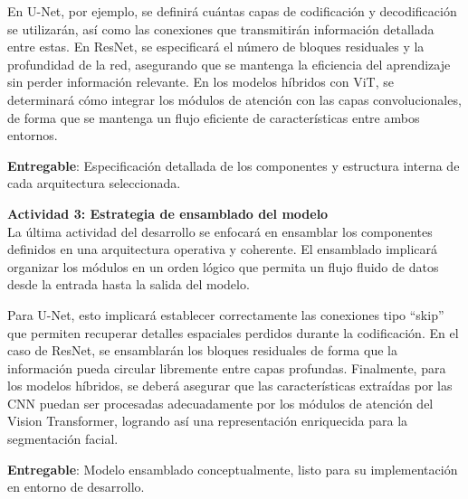 En U-Net, por ejemplo, se definirá cuántas capas de codificación y decodificación se utilizarán, así como las conexiones que transmitirán información detallada entre estas. En ResNet, se especificará el número de bloques residuales y la profundidad de la red, asegurando que se mantenga la eficiencia del aprendizaje sin perder información relevante. En los modelos híbridos con ViT, se determinará cómo integrar los módulos de atención con las capas convolucionales, de forma que se mantenga un flujo eficiente de características entre ambos entornos.

 \textbf{Entregable}: Especificación detallada de los componentes y estructura interna de cada arquitectura seleccionada.


 \textbf{Actividad 3: Estrategia de ensamblado del modelo}
 \\
 La última actividad del desarrollo se enfocará en ensamblar los componentes definidos en una arquitectura operativa y coherente. El ensamblado implicará organizar los módulos en un orden lógico que permita un flujo fluido de datos desde la entrada hasta la salida del modelo.

Para U-Net, esto implicará establecer correctamente las conexiones tipo “skip” que permiten recuperar detalles espaciales perdidos durante la codificación. En el caso de ResNet, se ensamblarán los bloques residuales de forma que la información pueda circular libremente entre capas profundas. Finalmente, para los modelos híbridos, se deberá asegurar que las características extraídas por las CNN puedan ser procesadas adecuadamente por los módulos de atención del Vision Transformer, logrando así una representación enriquecida para la segmentación facial.

 \textbf{Entregable}: Modelo ensamblado conceptualmente, listo para su implementación en entorno de desarrollo.

